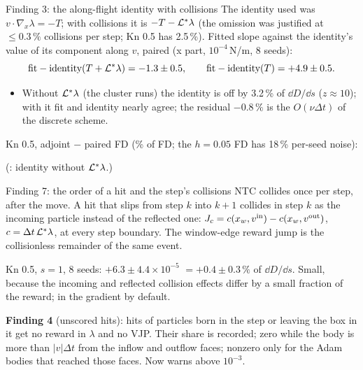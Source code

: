 \documentclass[10pt,aspectratio=169]{beamer}
\begin{document}
\begin{frame}{Finding 3: the along-flight identity with collisions}
\small
The identity used was $v\cdot\nabla_x\lambda = -T$; with collisions it is $-T - \mathcal L^*\lambda$
(the omission was justified at $\le0.3\,\%$ collisions per step; Kn 0.5 has 2.5\,\%).  Fitted slope
against the identity's value of its component along $v$, paired (x part, $10^{-4}$\,N/m, 8 seeds):
\[
\text{fit} - \text{identity}(T + \mathcal L^*\lambda) = -1.3\pm0.5,\qquad
\text{fit} - \text{identity}(T) = +4.9\pm0.5 .
\]
\begin{itemize}
\item Without $\mathcal L^*\lambda$ (the cluster runs) the identity is off by 3.2\,\% of $\dd D/\dd s$ ($z\approx10$);
  with it fit and identity nearly agree; the residual $-0.8\,\%$ is the $O(\nu\Delta t)$ of the discrete scheme.
\end{itemize}
\footnotesize
Kn 0.5, adjoint $-$ paired FD (\% of FD; the $h = 0.05$ FD has 18\,\% per-seed noise):

\medskip

\quad (: identity without $\mathcal L^*\lambda$.)
\end{frame}

\begin{frame}{Finding 7: the order of a hit and the step's collisions}
\small
NTC collides once per step, after the move.  A hit that slips from step $k$ into $k+1$ collides in
step $k$ as the incoming particle instead of the reflected one:
$J_c = c(x_w,v^{\mathrm{in}}) - c(x_w,v^{\mathrm{out}})$, $c = \Delta t\,\mathcal L^*\lambda$, at every step boundary.  The
window-edge reward jump is the collisionless remainder of the same event.

\medskip
Kn 0.5, $s = 1$, 8 seeds: $+6.3\pm4.4\times10^{-5}$ $= +0.4\pm0.3\,\%$ of $\dd D/\dd s$.  Small,
because the incoming and reflected collision effects differ by a small fraction of the reward; in
the gradient by default.

\medskip
\textbf{Finding 4} (unscored hits): hits of particles born in the step or leaving the box in it
get no reward in $\lambda$ and no VJP.  Their share is recorded; zero while the body is more than
$|v|\Delta t$ from the inflow and outflow faces; nonzero only for the  Adam bodies that
reached those faces.  Now warns above $10^{-3}$.
\end{frame}
\end{document}
